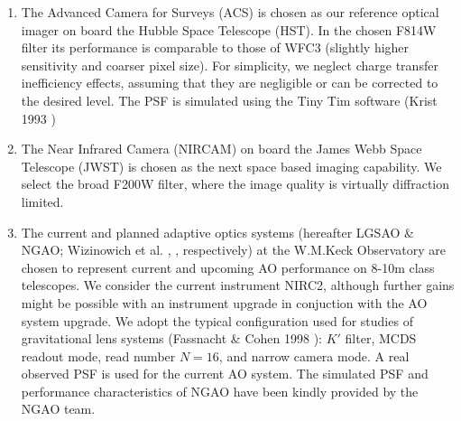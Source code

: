 \documentclass[a4paper,11pt]{article}
\begin{document}
\begin{enumerate}

\item  The Advanced Camera for Surveys (ACS) is chosen as our reference optical imager on board the Hubble Space Telescope (HST). In the chosen F814W filter its performance is comparable to those of WFC3 (slightly higher sensitivity and coarser pixel size). For simplicity, we neglect charge transfer inefficiency effects, assuming that they are negligible or can be corrected to the desired level. The PSF is simulated using the Tiny Tim software (Krist 1993 \cite{1993ASPC...52..536K})
    
\item The Near Infrared Camera (NIRCAM) on board the James Webb Space Telescope (JWST) is chosen as the next space based imaging capability. We select the broad F200W filter, where the image quality is virtually diffraction limited. 


\item The current and planned adaptive optics systems (hereafter LGSAO \& NGAO; Wizinowich et al. \citep{2006PASP..118..297W}, \citep{2010SPIE.7736E..0KW}, respectively) at the W.M.Keck Observatory are chosen to represent current and upcoming AO performance on 8-10m class telescopes. We consider the current instrument NIRC2, although further gains might be possible with an instrument upgrade in conjuction with the AO system upgrade. We adopt the typical configuration used for studies of gravitational lens systems (Fassnacht \& Cohen 1998 \citep{1998AJ....115..377F}): $K'$ filter, MCDS readout mode, read number $N=16$, and narrow camera mode. A real observed PSF is used for the current AO system. The simulated PSF and performance characteristics of NGAO have been kindly provided by the NGAO team.
    

\end{enumerate}
\end{document}

